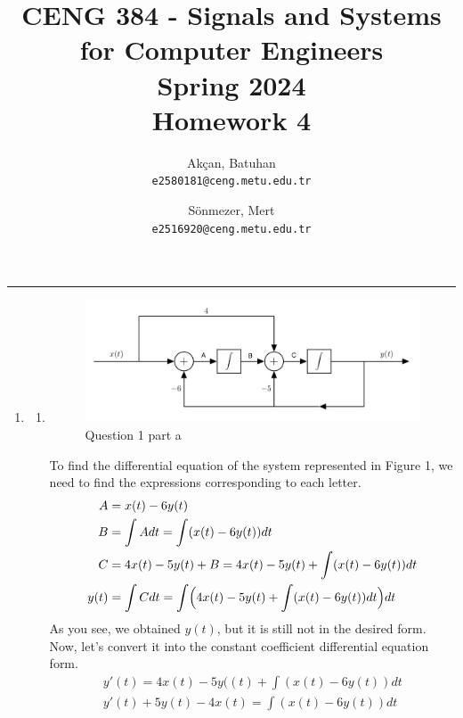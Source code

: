 \documentclass[10pt,a4paper, margin=1in]{article}
\author{
  Akçan, Batuhan\\
  \texttt{e2580181@ceng.metu.edu.tr}
  \and
  Sönmezer, Mert\\
  \texttt{e2516920@ceng.metu.edu.tr}
}
\title{CENG 384 - Signals and Systems for Computer Engineers \\
Spring 2024 \\
Homework 4}
\begin{document}
\maketitle



\noindent\rule{19cm}{1.2pt}

\begin{enumerate}

\item %
    \begin{enumerate}
        \item %
            \begin{figure}[htbp]
                \centering
                \includegraphics[width=1\linewidth]{q1a.jpg}
                \caption{Question 1 part a}
                \label{fig:q1a}
            \end{figure}\vspace{0.3cm}
            To find the differential equation of the system represented in Figure 1, we need to find the expressions corresponding to each letter.
            \begin{align*}
                A &= x(t) - 6y(t) \\
                B &= \int Adt = \int(x(t) - 6y(t))dt \\
                C &= 4x(t) - 5y(t) + B = 4x(t) - 5y(t) + \int(x(t) - 6y(t))dt \\
                y(t) &= \int Cdt = \int \Bigl( 4x(t) - 5y(t) + \int(x(t) - 6y(t))dt \Bigr) dt
            \end{align*}
            As you see, we obtained $y(t)$, but it is still not in the desired form. Now, let's convert it into the constant coefficient differential equation form.
            \begin{align*}
                y'(t) = 4x(t) - 5y((t) + \int(x(t) - 6y(t))dt \\
                y'(t) + 5y(t) - 4x(t) = \int(x(t) - 6y(t))dt \\

\end{align*}
\end{enumerate}
\end{enumerate}
\end{document}
